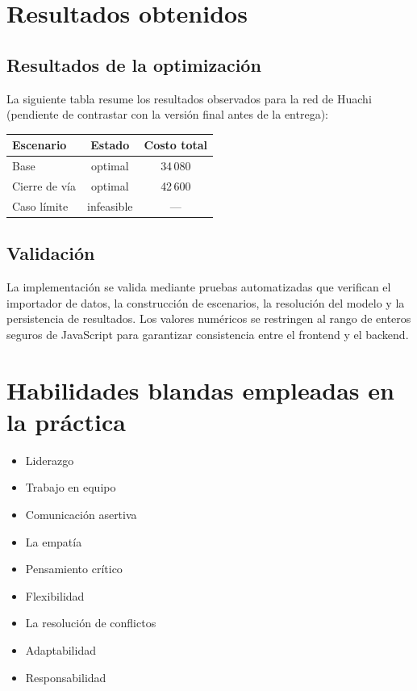 \documentclass{article}
\begin{document}
\section{Resultados obtenidos}

\subsection{Resultados de la optimización}
La siguiente tabla resume los resultados observados para la red de Huachi
(pendiente de contrastar con la versión final antes de la entrega):

\begin{center}
\begin{tabular}{ l c c }
    \toprule
    \textbf{Escenario} & \textbf{Estado} & \textbf{Costo total} \\
    \midrule
    Base            & optimal    & 34\,080 \\
    Cierre de vía   & optimal    & 42\,600 \\
    Caso límite     & infeasible & --- \\
    \bottomrule
\end{tabular}
\end{center}

\subsection{Validación}
La implementación se valida mediante pruebas automatizadas que verifican el
importador de datos, la construcción de escenarios, la resolución del modelo y
la persistencia de resultados. Los valores numéricos se restringen al rango de
enteros seguros de JavaScript para garantizar consistencia entre el frontend y
el backend.

\section{Habilidades blandas empleadas en la práctica}

\begin{itemize}
    \item[$\square$] Liderazgo
    \item[$\blacksquare$] Trabajo en equipo
    \item[$\square$] Comunicación asertiva
    \item[$\square$] La empatía
    \item[$\blacksquare$] Pensamiento crítico
    \item[$\square$] Flexibilidad
    \item[$\square$] La resolución de conflictos
    \item[$\square$] Adaptabilidad
    \item[$\blacksquare$] Responsabilidad
\end{itemize}
\end{document}
